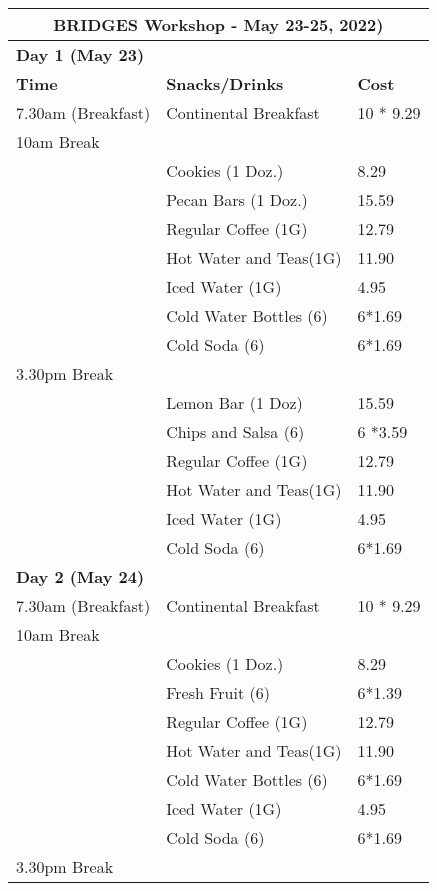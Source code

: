 \documentclass[10pt]{article}
\begin{document}
\begin{table}[htp]
{%
\begin{tabular}{lll} \hline
\multicolumn{3}{c}{\textbf{BRIDGES Workshop - May 23-25, 2022)}}\\ \hline\hline
\multicolumn{3}{l}{\textbf{Day 1 (May 23)}}\\ \hline
\textbf{Time}  &  \textbf{Snacks/Drinks} & \textbf{Cost} \\ \hline
7.30am (Breakfast)  &    Continental Breakfast  & 10 * 9.29  \\ \hline
10am Break   &    & \\
        &      Cookies (1 Doz.) &  8.29 \\
        &      Pecan Bars (1 Doz.) &  15.59 \\
		& 	   Regular Coffee (1G) & 12.79 \\
		& 	   Hot Water and Teas(1G) & 11.90 \\ 
        &       Iced Water (1G)& 4.95 \\
		& 	   Cold Water Bottles (6) & 6*1.69 \\
		& 	   Cold Soda  (6) & 6*1.69	\\ \hline
3.30pm Break &  & \\
		&		Lemon Bar (1 Doz) &  15.59 \\
		&	    Chips and Salsa (6)&   6 *3.59  \\	
		&	    Regular Coffee (1G) &  12.79 \\
		&	    Hot Water and Teas(1G) & 11.90  \\
        &        Iced Water (1G) & 4.95 \\
		&	    Cold Soda  (6) & 6*1.69	 \\ \hline
\multicolumn{3}{l}{\textbf{Day 2 (May 24)}}\\ \hline
7.30am (Breakfast)  &    Continental Breakfast  & 10 * 9.29  \\ \hline
10am Break   &    & \\
        &      Cookies (1 Doz.) &  8.29 \\
        &      Fresh Fruit (6)  &  6*1.39 \\
		&	   Regular Coffee (1G) & 12.79 \\
		&	   Hot Water and Teas(1G) & 11.90 \\ 
		&	   Cold Water Bottles (6) & 6*1.69 \\
        &      Iced Water (1G)& 4.95 \\
		&	   Cold Soda  (6) & 6*1.69	 \\ \hline
3.30pm Break &  & \\

\end{tabular}}
\end{table}
\end{document}
